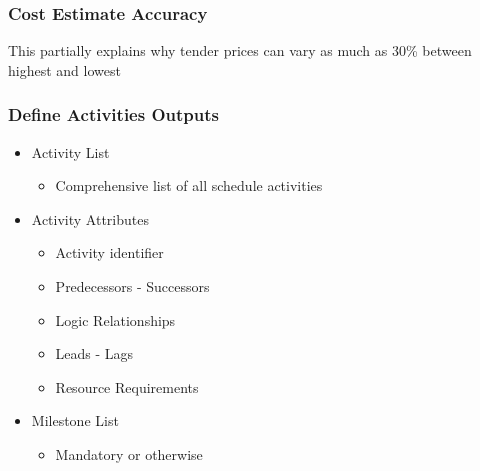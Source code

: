 \begin{frame}
\frametitle{Cost Estimate Accuracy}
\begin{table}
	\centering
		\caption{Kerzner (2009), P569}		
\end{table}	
This partially explains why tender prices can vary as much as 30\% between highest and lowest
\end{frame}





\begin{frame}
\frametitle{Define Activities \hfill Outputs}
\begin{itemize}
	\item Activity List
		\begin{itemize}
			\item Comprehensive list of all schedule activities
		\end{itemize}
	\item Activity Attributes
		\begin{itemize}
			\item Activity identifier
			\item Predecessors - Successors
			\item Logic Relationships
			\item Leads - Lags
			\item Resource Requirements
		\end{itemize}
	\item Milestone List
		\begin{itemize}
			\item Mandatory or otherwise
		\end{itemize}
\end{itemize}
\end{frame}





